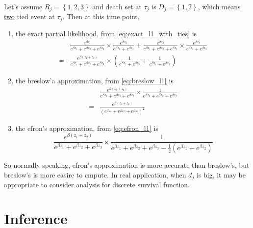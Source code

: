 \documentclass[a4paper,12pt]{article}
\begin{document}
Let's assume $R_j = \left\{1, 2, 3\right\}$ and death set at $\tau_j$ is $D_j = \left\{1, 2\right\}$, which means \underline{two} tied event at $\tau_j$. Then at this time point,
\begin{enumerate}
\item the exact partial likelihood, from \eqref{eq:exact_l1_with_ties} is
\[
  \begin{aligned}
    & \frac{
      e^{\beta z_1}
    }{
      e^{\beta z_1} + e^{\beta z_2} + e^{\beta z_3}
    }
    \times \frac{
      e^{\beta z_2}
    }{
      e^{\beta z_2} + e^{\beta z_3}
    }
    + \frac{
      e^{\beta z_2}
    }{
      e^{\beta z_1} + e^{\beta z_2} + e^{\beta z_3}
    }
    \times \frac{
      e^{\beta z_1}
    }{
      e^{\beta z_1} + e^{\beta z_3}
    }    \\
    =& \frac{
      e^{\beta\left(z_1 + z_2\right)}
    }{
      e^{\beta z_1} + e^{\beta z_2} + e^{\beta z_3}
    }
    \times \left(
      \frac{1}{e^{\beta z_2} + e^{\beta z_3}}
      + \frac{1}{e^{\beta z_1} + e^{\beta z_3}}
    \right)
  \end{aligned}
\]
\item the breslow'a approximation, from \eqref{eq:breslow_l1} is
  \[
    \begin{aligned}
      & \frac{
      e^{\beta\left(z_1 + z_2\right)}
    }{
      e^{\beta z_1} + e^{\beta z_2} + e^{\beta z_3}
    }
      \times
      \frac{1}{
        e^{\beta z_1} + e^{\beta z_2} + e^{\beta z_3}
      }    \\
      =& \frac{
        e^{\beta\left(z_1 + z_2\right)}
      }{
        \left(
          e^{\beta z_1} + e^{\beta z_2} + e^{\beta z_3}
        \right)^2
      }
    \end{aligned}
  \]
\item the efron's approximation, from \eqref{eq:efron_l1} is
  \[
    \frac{
      e^{\beta\left(z_1 + z_2\right)}
    }{
      e^{\beta z_1} + e^{\beta z_2} + e^{\beta z_3}
      }
      \times
      \frac{1}{
        e^{\beta z_1} + e^{\beta z_2} + e^{\beta z_3}
        - \frac{1}{2}\left(
          e^{\beta z_1} + e^{\beta z_2}
        \right)
      }
  \]
\end{enumerate}
So normally speaking, efron's approximation is more accurate than breslow's, but breslow's is more easire to cmpute. In real application, when $d_j$ is big, it may be appropriate to consider analysis for discrete survival function.


\section{Inference}
\label{sec:inference}
\end{document}
